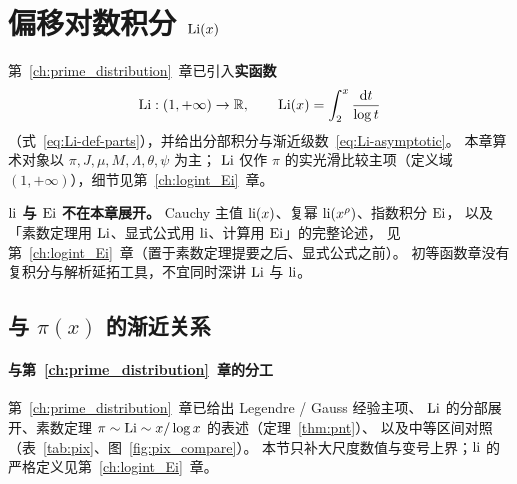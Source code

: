 \begin{center}
\end{center}
\section{偏移对数积分 \texorpdfstring{$\operatorname{Li}(x)$}{Li(x)}}
\label{sec:offset_logarithmic_integral}

第~\ref{ch:prime_distribution}~章已引入\textbf{实函数}
\[
  \operatorname{Li}:(1,+\infty)\to\mathbb{R},
  \qquad
  \operatorname{Li}(x)=\int_2^x\frac{\mathrm{d}t}{\log t}
\]
（式~\eqref{eq:Li-def-parts}），并给出分部积分与渐近级数~\eqref{eq:Li-asymptotic}。
本章算术对象以 $\pi,J,\mu,M,\Lambda,\theta,\psi$ 为主；
$\operatorname{Li}$ 仅作 $\pi$ 的实光滑比较主项（定义域 $(1,+\infty)$），细节见第~\ref{ch:logint_Ei}~章。

\noindent\textbf{$\operatorname{li}$ 与 $\operatorname{Ei}$ 不在本章展开。}
Cauchy 主值 $\operatorname{li}(x)$、复幂 $\operatorname{li}(x^{\rho})$、指数积分 $\operatorname{Ei}$，
以及「素数定理用 $\operatorname{Li}$、显式公式用 $\operatorname{li}$、计算用 $\operatorname{Ei}$」的完整论述，
见第~\ref{ch:logint_Ei}~章（置于素数定理提要之后、显式公式之前）。
初等函数章没有复积分与解析延拓工具，不宜同时深讲 $\operatorname{Li}$ 与 $\operatorname{li}$。

\subsection{与 \texorpdfstring{$\pi(x)$}{pi(x)} 的渐近关系}\label{subsec:Li_pi_asymp}

\paragraph{与第~\ref{ch:prime_distribution}~章的分工}
第~\ref{ch:prime_distribution}~章已给出 Legendre / Gauss 经验主项、
$\operatorname{Li}$ 的分部展开、素数定理 $\pi\sim\operatorname{Li}\sim x/\log x$ 的表述（定理~\ref{thm:pnt}）、
以及中等区间对照（表~\ref{tab:pix}、图~\ref{fig:pix_compare}）。
本节只补大尺度数值与变号上界；$\operatorname{li}$ 的严格定义见第~\ref{ch:logint_Ei}~章。

